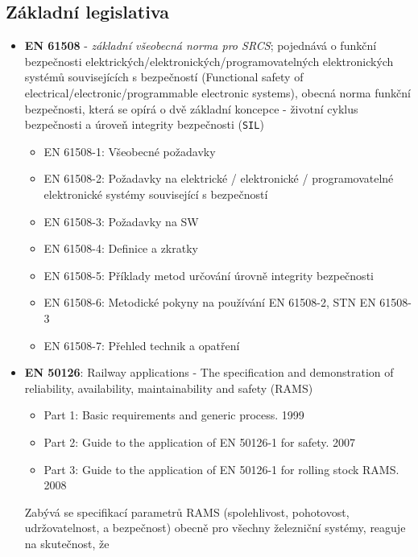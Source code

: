 {    \subsection{Základní legislativa}
      \begin{itemize}
        \item \textbf{EN 61508} - \emph{základní všeobecná norma pro SRCS}; pojednává o funkční
              bezpečnosti elektrických/elektronických/programovatelných elektronických systémů
              souvisejících s bezpečností (Functional safety of electrical/electronic/programmable
              electronic systems), obecná norma funkční bezpečnosti, která se opírá o dvě základní
              koncepce - životní cyklus bezpečnosti a úroveň integrity bezpečnosti (\texttt{SIL})
              \begin{itemize}
                \item EN 61508-1: Všeobecné požadavky
                \item EN 61508-2: Požadavky na elektrické / elektronické / programovatelné
                                  elektronické systémy související s bezpečností
                \item EN 61508-3: Požadavky na SW
                \item EN 61508-4: Definice a zkratky
                \item EN 61508-5: Příklady metod určování úrovně integrity bezpečnosti
                \item EN 61508-6: Metodické pokyny na používání EN 61508-2, STN EN 61508-3
                \item EN 61508-7: Přehled technik a opatření
              \end{itemize}
        \item \textbf{EN 50126}: Railway applications - The specification and demonstration of
              reliability, availability, maintainability and safety (RAMS)
              \begin{itemize}
                \item Part 1: Basic requirements and generic process. 1999
                \item Part 2: Guide to the application of EN 50126-1 for safety. 2007
                \item Part 3: Guide to the application of EN 50126-1 for rolling stock RAMS. 2008  
              \end{itemize}
              Zabývá se specifikací parametrů RAMS (spolehlivost, pohotovost, udržovatelnost,
              a bezpečnost) obecně pro všechny železniční systémy, reaguje na skutečnost, že

\end{itemize}}
